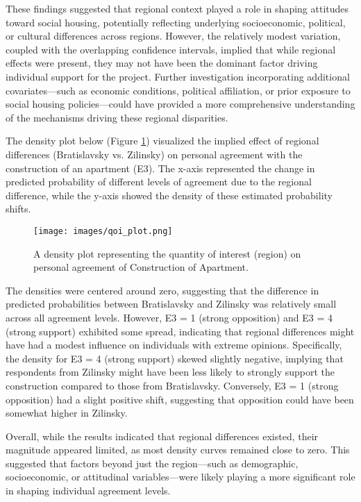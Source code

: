\documentclass[titlepage]{article}
\begin{document}
\justify
These findings suggested that regional context played a role in shaping attitudes toward social housing, potentially reflecting underlying socioeconomic, political, or cultural differences across regions. However, the relatively modest variation, coupled with the overlapping confidence intervals, implied that while regional effects were present, they may not have been the dominant factor driving individual support for the project. Further investigation incorporating additional covariates—such as economic conditions, political affiliation, or prior exposure to social housing policies—could have provided a more comprehensive understanding of the mechanisms driving these regional disparities.

\justify
The density plot below (Figure \ref{fig:qoi}) visualized the implied effect of regional differences (Bratislavsky vs. Zilinsky) on personal agreement with the construction of an apartment (E3). The x-axis represented the change in predicted probability of different levels of agreement due to the regional difference, while the y-axis showed the density of these estimated probability shifts.

\begin{figure}[H]
    \centering
    \texttt{[image: images/qoi\_plot.png]}
    \caption{A density plot representing the quantity of interest (region) on personal agreement of Construction of Apartment.}
    \label{fig:qoi}
\end{figure}

\justify
The densities were centered around zero, suggesting that the difference in predicted probabilities between Bratislavsky and Zilinsky was relatively small across all agreement levels. However, E3 = 1 (strong opposition) and E3 = 4 (strong support) exhibited some spread, indicating that regional differences might have had a modest influence on individuals with extreme opinions. Specifically, the density for E3 = 4 (strong support) skewed slightly negative, implying that respondents from Zilinsky might have been less likely to strongly support the construction compared to those from Bratislavsky. Conversely, E3 = 1 (strong opposition) had a slight positive shift, suggesting that opposition could have been somewhat higher in Zilinsky.

\justify
Overall, while the results indicated that regional differences existed, their magnitude appeared limited, as most density curves remained close to zero. This suggested that factors beyond just the region—such as demographic, socioeconomic, or attitudinal variables—were likely playing a more significant role in shaping individual agreement levels.
\end{document}
